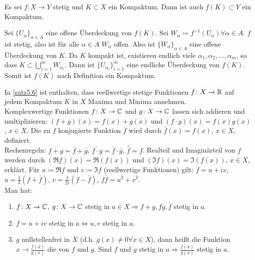 \begin{satz}
Es sei $ f\colon X\rightarrow Y $ stetig und $ K\subset X $ ein Kompaktum. Dann ist auch $ f(K)\subset Y $ ein Kompaktum.
\end{satz}
\begin{beweis}
Sei $ \lbrace U_\alpha\rbrace_{\alpha\in A} $ eine offene \"Uberdeckung von $ f(K) $. Sei $ W_\alpha\coloneqq f^{-1}(U_\alpha)\forall\alpha\in A $. $ f $ ist stetig, also ist f\"ur alle $ \alpha\in A $ $ W_\alpha $ offen. Also ist $ \lbrace W_\alpha\rbrace_{\alpha\in A} $ eine offene \"Uberdeckung von $ K $. Da $ K $ kompakt ist, existieren endlich viele $ \alpha_1,\alpha_2,...,\alpha_m $, so dass $ K\subset\bigcup_{i=1}^m W_{\alpha_i} $. Dann ist $ \lbrace U_{\alpha_i}\rbrace_{i=1}^m $ eine endliche \"Uberdeckung von $ f(K) $. Somit ist $ f(K) $ nach Definition ein Kompaktum. 
\end{beweis}
In \ref{satz5.6} ist enthalten, dass reellwertige stetige Funktionen $ f\colon X\rightarrow\mathbb{R} $ auf jedem Kompaktum $ K $ in $ X $ Maxima und Minima annehmen.\\
Komplexwertige Funktionen $ f\colon X\rightarrow\mathbb{C} $ und $ g\colon X\rightarrow\mathbb{C} $ lassen sich addieren und multiplizieren: $ (f+g)(x)=f(x)+g(x) $ und $ (f\cdot g)(x)=f(x)g(x) $, $ x\in X $. Die zu $ f $ konjugierte Funktion $ \bar f $ wird durch $ \bar f(x)=\overline{f(x)} $, $ x\in X $, definiert.\\
Rechenregeln: $ \overline{f+g}=\bar f+\bar g $, $ \overline{f\cdot g}=\bar f\cdot\bar g $, $ \bar{\bar f}=f $. Realteil und Imagin\"arteil von $ f $ werden durch $ (\Re f)(x)=\Re (f(x)) $ und $ (\Im f)(x)=\Im (f(x)) $, $ x\in X $, erklärt. F\"ur $ u\coloneqq\Re f $ und $ v\coloneqq \Im f $ (reellwertige Funktionen) gilt: $ f=u+iv $, $ u=\frac{1}{2}(f+\bar f) $, $ v=\frac{1}{2i}(f-\bar f) $, $ f\bar f=u^2+v^2 $.\\
Man hat:
\begin{enumerate}
\item $ f\colon X\rightarrow\mathbb{C} $, $ g\colon X\rightarrow\mathbb{C} $ stetig in $ a\in X \Rightarrow f+g, fg, \bar f$ stetig in $ a $.
\item $ f=u+iv $ stetig in $ a\Leftrightarrow u,v$ stetig in $ a $.
\item $ g $ nullstellenfrei in $ X $ (d.h. $ g(x)\neq 0\forall x\in X $), dann hei\ss t die Funktion $ x\rightarrow \frac{f(x)}{g(x)} $ die  von $ f $ und $ g $. Sind $ f $ und $ g $ stetig in $ a\Rightarrow\frac{f(x)}{g(x)} $ stetig in $ a $.
\end{enumerate}